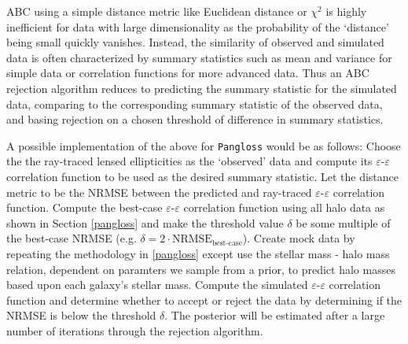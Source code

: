 \documentclass[%
 reprint,
 amsmath,amssymb,
 aps,nofootinbib
]{revtex4-1}
\begin{document}
ABC using a simple distance metric like Euclidean distance or $\chi^2$ is highly inefficient for data with large dimensionality as the probability of the `distance' being small quickly vanishes. Instead, the similarity of observed and simulated data is often characterized by summary statistics such as mean and variance for simple data or correlation functions for more advanced data. Thus an ABC rejection algorithm reduces to predicting the summary statistic for the simulated data, comparing to the corresponding summary statistic of the observed data, and basing rejection on a chosen threshold of difference in summary statistics.

A possible implementation of the above for \texttt{Pangloss} would be as follows: Choose the the ray-traced lensed ellipticities as the `observed' data and compute its $\varepsilon$-$\varepsilon$ correlation function to be used as the desired summary statistic. Let the distance metric to be the NRMSE between the predicted and ray-traced $\varepsilon$-$\varepsilon$ correlation function. Compute the best-case $\varepsilon$-$\varepsilon$ correlation function using all halo data as shown in Section \ref{pangloss} and make the threshold value $\delta$ be some multiple of the best-case NRMSE (e.g. ${\delta=2\cdot\text{NRMSE}_{\text{best-case}}}$). Create mock data by repeating the methodology in \ref{pangloss} except use the stellar mass - halo mass relation, dependent on paramters we sample from a prior, to predict halo masses based upon each galaxy's stellar mass. Compute the simulated $\varepsilon$-$\varepsilon$ correlation function and determine whether to accept or reject the data by determining if the NRMSE is below the threshold $\delta$. The posterior will be estimated after a large number of iterations through the rejection algorithm.

\end{document}
